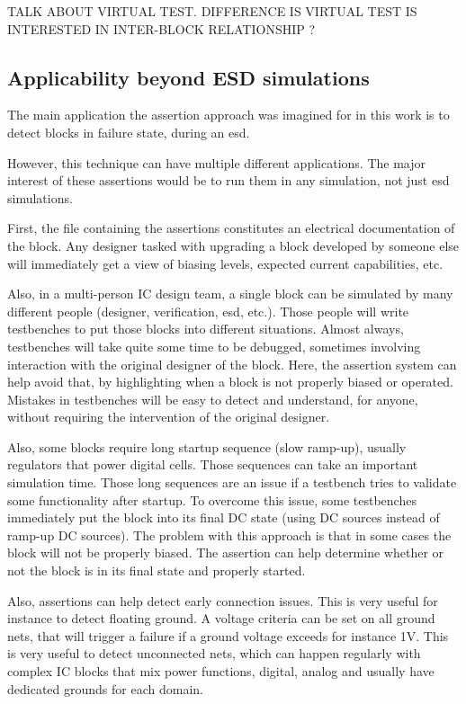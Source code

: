 TALK ABOUT VIRTUAL TEST. DIFFERENCE IS VIRTUAL TEST IS INTERESTED IN INTER-BLOCK RELATIONSHIP ?

\subsection{Applicability beyond ESD simulations}

The main application the assertion approach was imagined for in this work is to detect blocks in failure state,
during an \gls{esd}.

However, this technique can have multiple different applications.
The major interest of these assertions would be to run them in any simulation, not just \gls{esd} simulations.

First, the file containing the assertions constitutes an electrical documentation of the block.
Any designer tasked with upgrading a block developed by someone else will immediately get a view of biasing levels,
expected current capabilities, etc.

Also, in a multi-person IC design team, a single block can be simulated by many different people (designer, verification, esd, etc.).
Those people will write testbenches to put those blocks into different situations.
Almost always, testbenches will take quite some time to be debugged, sometimes involving interaction with the original designer of the block.
Here, the assertion system can help avoid that, by highlighting when a block is not properly biased or operated.
Mistakes in testbenches will be easy to detect and understand, for anyone, without requiring the intervention of the original designer.

Also, some blocks require long startup sequence (slow ramp-up), usually regulators that power digital cells.
Those sequences can take an important simulation time.
Those long sequences are an issue if a testbench tries to validate some functionality after startup.
To overcome this issue, some testbenches immediately put the block into its final DC state (using DC sources instead of ramp-up DC sources).
The problem with this approach is that in some cases the block will not be properly biased.
The assertion can help determine whether or not the block is in its final state and properly started.

Also, assertions can help detect early connection issues.
This is very useful for instance to detect floating ground.
A voltage criteria can be set on all ground nets, that will trigger a failure if a ground voltage exceeds for instance 1V.
This is very useful to detect unconnected nets, which can happen regularly with complex IC blocks that mix power functions, digital, analog
and usually have dedicated grounds for each domain.

